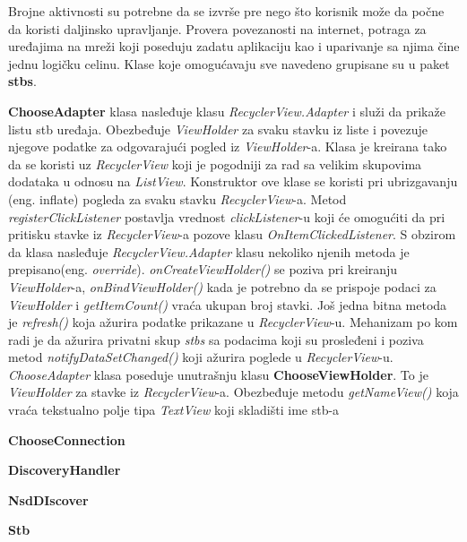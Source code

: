 \documentclass[struktura.tex]{subfiles}
\begin{document}
Brojne aktivnosti su potrebne da se izvrše pre nego što korisnik može da počne da koristi daljinsko upravljanje. Provera povezanosti na internet, potraga za uređajima na mreži koji poseduju zadatu aplikaciju kao i uparivanje sa njima čine jednu logičku celinu. Klase koje omogućavaju sve navedeno grupisane su u paket \textbf{stbs}.

\textbf{ChooseAdapter} klasa nasleđuje klasu \textit{RecyclerView.Adapter} i služi da prikaže listu stb uređaja. Obezbeđuje \textit{ViewHolder} za svaku stavku iz liste i povezuje njegove podatke za odgovarajući pogled iz \textit{ViewHolder}-a. Klasa je kreirana tako da se koristi uz \textit{RecyclerView} koji je pogodniji za rad sa velikim skupovima dodataka u odnosu na \textit{ListView}. Konstruktor ove klase se koristi pri ubrizgavanju (eng. inflate) pogleda za svaku stavku \textit{RecyclerView}-a. Metod \textit{registerClickListener} postavlja vrednost \textit{clickListener}-u koji će omogućiti da pri pritisku stavke iz \textit{RecyclerView}-a pozove klasu \textit{OnItemClickedListener}. S obzirom da klasa nasleđuje \textit{RecyclerView.Adapter} klasu nekoliko njenih metoda je  prepisano(eng. \textit{override}). \textit{onCreateViewHolder()} se poziva pri kreiranju \textit{ViewHolder}-a, \textit{onBindViewHolder()} kada je potrebno da se prispoje podaci za \textit{ViewHolder} i \textit{getItemCount()} vraća ukupan broj stavki. Još jedna bitna metoda je \textit{refresh()} koja ažurira podatke prikazane u \textit{RecyclerView}-u. Mehanizam po kom radi je da ažurira privatni skup \textit{stbs} sa podacima koji su prosleđeni i poziva metod \textit{notifyDataSetChanged()} koji ažurira poglede u \textit{RecyclerView}-u. \textit{ChooseAdapter} klasa poseduje unutrašnju klasu \textbf{ChooseViewHolder}. To je \textit{ViewHolder} za stavke iz \textit{RecyclerView}-a. Obezbeđuje metodu \textit{getNameView()} koja vraća tekstualno polje tipa \textit{TextView} koji skladišti ime stb-a

\textbf{ChooseConnection} 

\textbf{DiscoveryHandler}

\textbf{NsdDIscover}

\textbf{Stb}
\end{document}
